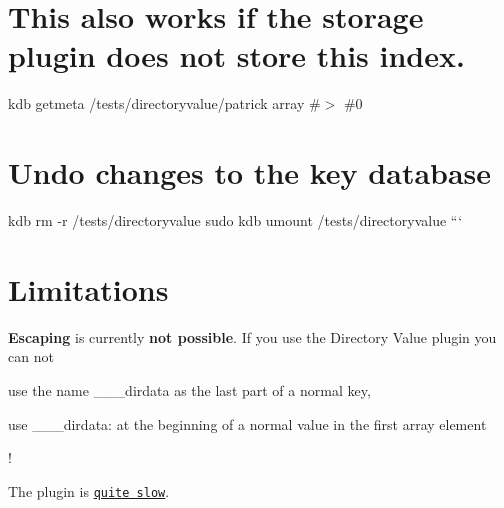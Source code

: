 \section*{This also works if the storage plugin does not store this index.}

kdb getmeta /tests/directoryvalue/patrick array \#$>$ \#0

\section*{Undo changes to the key database}

kdb rm -\/r /tests/directoryvalue sudo kdb umount /tests/directoryvalue ```

\section*{Limitations}


\begin{DoxyItemize}
\item {\bfseries Escaping} is currently {\bfseries not possible}. If you use the Directory Value plugin you can not
\begin{DoxyItemize}
\item use the name {\ttfamily \+\_\+\+\_\+\+\_\+dirdata} as the last part of a normal key,
\item use {\ttfamily \+\_\+\+\_\+\+\_\+dirdata\+:} at the beginning of a normal value in the first array element
\end{DoxyItemize}

!
\item The plugin is \href{https://issues.libelektra/2281}{\tt quite slow}. 
\end{DoxyItemize}